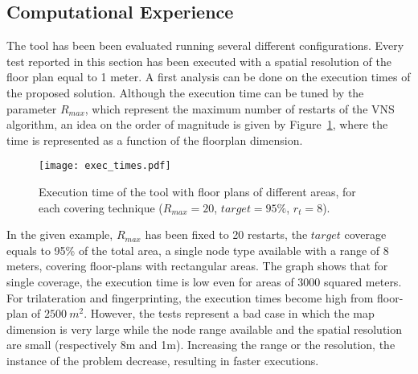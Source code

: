 \subsection{Computational Experience}\label{subsec:comp_res}
The tool has been been evaluated running several different configurations. Every test reported in this section has been executed with a spatial resolution of the floor plan equal to 1 meter.  A first analysis can be done on the execution times of the proposed solution. Although the execution time can be tuned by the parameter $R_{max}$, which represent the maximum number of restarts of the VNS algorithm, an idea on the order of magnitude is given by Figure~\ref{fig:time}, where the time is represented as a function of the floorplan dimension. 
\begin{figure}[h!tb]
\centering\texttt{[image: exec\_times.pdf]}
\caption{Execution time of the tool with floor plans of different areas, for each covering technique ($R_{max} = 20$, $target = 95\%$, $r_t=8$).}
\label{fig:time}
\end{figure}
In the given example, $R_{max}$ has been fixed to 20 restarts, the $target$ coverage equals to 95\% of the total area, a single node type available with a range of 8 meters, covering floor-plans with rectangular areas. The graph shows that for single coverage, the execution time is low even for areas of 3000 squared meters. For trilateration and fingerprinting, the execution times become high from floor-plan of $2500~m^2$. However, the tests represent a bad case in which the map dimension is very large while the node range available and the spatial resolution are small (respectively 8m and 1m). Increasing the range or the resolution, the instance of the problem decrease, resulting in faster executions.

